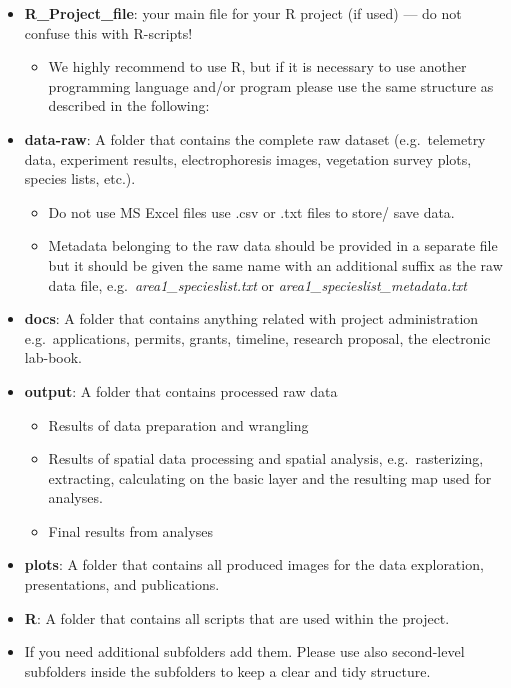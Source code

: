 \documentclass[
  english,
]{article}
\providecommand{\tightlist}{%
  \setlength{\itemsep}{0pt}\setlength{\parskip}{0pt}}
\begin{document}
\begin{itemize}
\tightlist
\item
  \textbf{R\_Project\_file}: your main file for your R project (if used)
  --- do not confuse this with R-scripts!

  \begin{itemize}
  \tightlist
  \item
    We highly recommend to use R, but if it is necessary to use another
    programming language and/or program please use the same structure as
    described in the following:
  \end{itemize}
\item
  \textbf{data-raw}: A folder that contains the complete raw dataset
  (e.g.~telemetry data, experiment results, electrophoresis images,
  vegetation survey plots, species lists, etc.).

  \begin{itemize}
  \tightlist
  \item
    Do not use MS Excel files use .csv or .txt files to store/ save
    data.
  \item
    Metadata belonging to the raw data should be provided in a separate
    file but it should be given the same name with an additional suffix
    as the raw data file, e.g.~\emph{area1\_specieslist.txt} or
    \emph{area1\_specieslist\_metadata.txt}
  \end{itemize}
\item
  \textbf{docs}: A folder that contains anything related with project
  administration e.g.~applications, permits, grants, timeline, research
  proposal, the electronic lab-book.
\item
  \textbf{output}: A folder that contains processed raw data

  \begin{itemize}
  \tightlist
  \item
    Results of data preparation and wrangling
  \item
    Results of spatial data processing and spatial analysis,
    e.g.~rasterizing, extracting, calculating on the basic layer and the
    resulting map used for analyses.
  \item
    Final results from analyses
  \end{itemize}
\item
  \textbf{plots}: A folder that contains all produced images for the
  data exploration, presentations, and publications.
\item
  \textbf{R}: A folder that contains all scripts that are used within
  the project.
\item
  If you need additional subfolders add them. Please use also
  second-level subfolders inside the subfolders to keep a clear and tidy
  structure.
\end{itemize}
\end{document}
